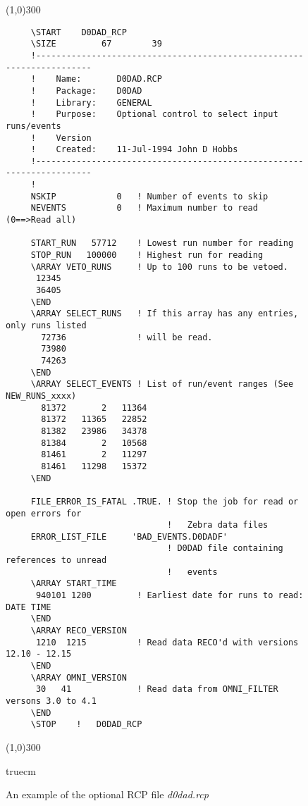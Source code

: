 \begin{figure}
  \centerline{\line(1,0){300}}
  \tiny
  \begin{center}
   \begin{verbatim}
     \START    D0DAD_RCP
     \SIZE         67        39
     !----------------------------------------------------------------------
     !    Name:       D0DAD.RCP
     !    Package:    D0DAD
     !    Library:    GENERAL
     !    Purpose:    Optional control to select input runs/events
     !    Version
     !    Created:    11-Jul-1994 John D Hobbs
     !----------------------------------------------------------------------
     !
     NSKIP            0   ! Number of events to skip
     NEVENTS          0   ! Maximum number to read (0==>Read all)

     START_RUN   57712    ! Lowest run number for reading
     STOP_RUN   100000    ! Highest run for reading
     \ARRAY VETO_RUNS     ! Up to 100 runs to be vetoed.
      12345
      36405   
     \END
     \ARRAY SELECT_RUNS   ! If this array has any entries, only runs listed 
       72736              ! will be read.
       73980
       74263
     \END
     \ARRAY SELECT_EVENTS ! List of run/event ranges (See NEW_RUNS_xxxx)
       81372       2   11364
       81372   11365   22852
       81382   23986   34378
       81384       2   10568
       81461       2   11297
       81461   11298   15372
     \END 

     FILE_ERROR_IS_FATAL .TRUE. ! Stop the job for read or open errors for 
                                !   Zebra data files
     ERROR_LIST_FILE     'BAD_EVENTS.D0DADF'
                                ! D0DAD file containing references to unread
                                !   events
     \ARRAY START_TIME  
      940101 1200         ! Earliest date for runs to read: DATE TIME
     \END
     \ARRAY RECO_VERSION  
      1210  1215          ! Read data RECO'd with versions 12.10 - 12.15
     \END
     \ARRAY OMNI_VERSION 
      30   41             ! Read data from OMNI_FILTER versons 3.0 to 4.1
     \END
     \STOP    !   D0DAD_RCP
   \end{verbatim}
  \end{center}
  \centerline{\line(1,0){300}}
   truecm
  \caption{An example of the optional RCP file {\em d0dad.rcp}\label{f-RCP}}
\end{figure}

